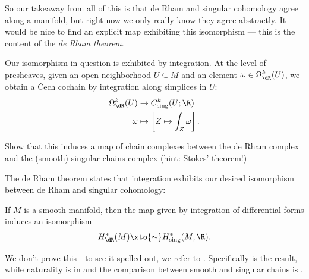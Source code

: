 \documentclass[11pt]{amsart}
\begin{document}
So our takeaway from all of this is that de Rham and singular cohomology agree along a manifold, but right now we only really know they agree abstractly. It would be nice to find an explicit map exhibiting this isomorphism --- this is the content of the \emph{de Rham theorem}.

Our isomorphism in question is exhibited by integration. At the level of presheaves, given an open neighborhood $U \subseteq M$ and an element $\omega \in \Omega^k_\dR(U)$, we obtain a \v{C}ech cochain by integration along simplices in $U$:
\begin{align*}
    \Omega_{\dR}^k(U) &\to C^k_{\text{sing}}(U;\R) \\
    \omega &\mapsto \left[ Z \mapsto \int_Z \omega \right].
\end{align*}
\begin{exercise}\label{exer:integration-is-map-of-complexes} 
Show that this induces a map of chain complexes between the de Rham complex and the (smooth) singular chains complex (hint: Stokes' theorem!)
\end{exercise}

The de Rham theorem states that integration exhibits our desired isomorphism between de Rham and singular cohomology:

\begin{theorem} 
\label{thm:de-Rham}
If $M$ is a smooth manifold, then the map given by integration of differential forms induces an isomorphism
\begin{align*}
    H^\ast_\dR(M) \xto{\sim} H^\ast_\text{sing}(M,\R).
\end{align*}
\end{theorem}
We don't prove this - to see it spelled out, we refer to \cite[Chapter~16]{leeIntroductionSmoothManifolds2012}. Specifically \cite[16.12]{leeIntroductionSmoothManifolds2012} is the result, while naturality is in \cite[16.11]{leeIntroductionSmoothManifolds2012} and the comparison between smooth and singular chains is \cite[16.6]{leeIntroductionSmoothManifolds2012}.
\end{document}
